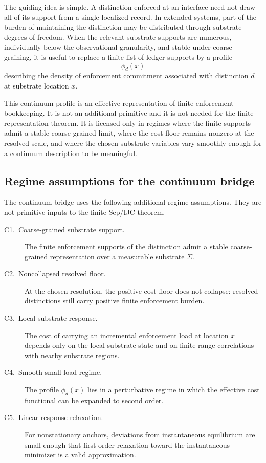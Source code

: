 \documentclass[11pt]{article}
\begin{document}
The guiding idea is simple.  A distinction enforced at an interface need
not draw all of its support from a single localized record.  In extended
systems, part of the burden of maintaining the distinction may be
distributed through substrate degrees of freedom.  When the relevant
substrate supports are numerous, individually below the observational
granularity, and stable under coarse-graining, it is useful to replace a
finite list of ledger supports by a profile
\[
    \phi_d(x)
\]
describing the density of enforcement commitment associated with
distinction $d$ at substrate location $x$.

This continuum profile is an effective representation of finite
enforcement bookkeeping.  It is not an additional primitive and it is
not needed for the finite representation theorem.  It is licensed only
in regimes where the finite supports admit a stable coarse-grained
limit, where the cost floor remains nonzero at the resolved scale, and
where the chosen substrate variables vary smoothly enough for a
continuum description to be meaningful.

\subsection{Regime assumptions for the continuum bridge}\label{subsec:continuum-bridge-regime}

The continuum bridge uses the following additional regime assumptions.
They are not primitive inputs to the finite Sep/IJC theorem.

\begin{description}
\item[C1.\ Coarse-grained substrate support.]
The finite enforcement supports of the distinction admit a stable
coarse-grained representation over a measurable substrate $\Sigma$.

\item[C2.\ Noncollapsed resolved floor.]
At the chosen resolution, the positive cost floor does not collapse:
resolved distinctions still carry positive finite enforcement burden.

\item[C3.\ Local substrate response.]
The cost of carrying an incremental enforcement load at location $x$
depends only on the local substrate state and on finite-range
correlations with nearby substrate regions.

\item[C4.\ Smooth small-load regime.]
The profile $\phi_d(x)$ lies in a perturbative regime in which the
effective cost functional can be expanded to second order.

\item[C5.\ Linear-response relaxation.]
For nonstationary anchors, deviations from instantaneous equilibrium
are small enough that first-order relaxation toward the instantaneous
minimizer is a valid approximation.
\end{description}
\end{document}
